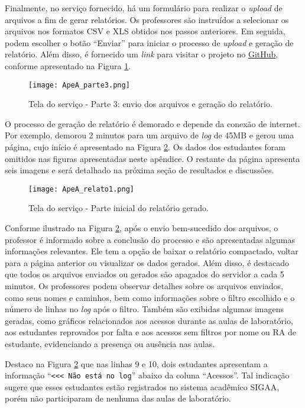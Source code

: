 Finalmente, no serviço fornecido, há um formulário para realizar o \textit{upload} de arquivos a fim de gerar relatórios. Os professores são instruídos a selecionar os arquivos nos formatos CSV e XLS obtidos nos passos anteriores. Em seguida, podem escolher o botão ``Enviar'' para iniciar o processo de \textit{upload} e geração de relatório. Além disso, é fornecido um \textit{link} para visitar o projeto no \href{https://github.com/fzampirolli/LabMoodle}{GitHub}, conforme apresentado na Figura \ref{fig:ApeA_parte3}.

\begin{figure}[!ht]
\centering
\texttt{[image: ApeA\_parte3.png]}
    \caption{Tela do serviço - Parte 3: envio dos arquivos e geração do relatório.}
\label{fig:ApeA_parte3}
\end{figure}

O processo de geração de relatório é demorado e depende da conexão de internet. Por exemplo, demorou 2 minutos para um arquivo de \textit{log} de 45MB e gerou uma página, cujo início é apresentado na Figura \ref{fig:ApeA_relato1}. Os dados dos estudantes foram omitidos nas figuras apresentadas neste apêndice. O restante da página apresenta seis imagens e será detalhado na próxima seção de resultados e discussões.

\begin{figure}[]
\centering
\texttt{[image: ApeA\_relato1.png]}
    \caption{Tela do serviço - Parte inicial do relatório gerado.}
\label{fig:ApeA_relato1}
\end{figure}

Conforme ilustrado na Figura \ref{fig:ApeA_relato1}, após o envio bem-sucedido dos arquivos, o professor é informado sobre a conclusão do processo e são apresentadas algumas informações relevantes. Ele tem a opção de baixar o relatório compactado, voltar para a página anterior ou visualizar os dados gerados. Além disso, é destacado que todos os arquivos enviados ou gerados são apagados do servidor a cada 5 minutos. Os professores podem observar detalhes sobre os arquivos enviados, como seus nomes e caminhos, bem como informações sobre o filtro escolhido e o número de linhas no \textit{log} após o filtro. Também são exibidas algumas imagens geradas, como gráficos relacionados aos acessos durante as aulas de laboratório, aos estudantes reprovados por falta e aos acessos sem filtros por nome ou RA de estudante, evidenciando a presença ou ausência nas aulas. 

Destaco na Figura \ref{fig:ApeA_relato1} que nas linhas 9 e 10, dois estudantes apresentam a informação ``\verb|<<< Não está no log|'' abaixo da coluna ``Acessos''. Tal indicação sugere que esses estudantes estão registrados no sistema acadêmico SIGAA, porém não participaram de nenhuma das aulas de laboratório.

